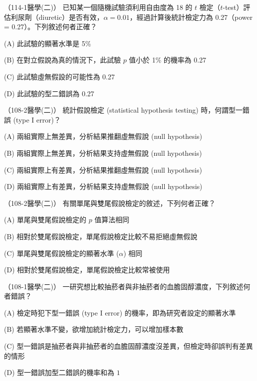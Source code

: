     \begin{docexam}{（114-1醫學(二)）}
        已知某一個隨機試驗須利用自由度為 18 的 $t$ 檢定（$t$-test）評估利尿劑（diuretic）是否有效，$\alpha = 0.01$，經過計算後統計檢定力為 0.27（power = 0.27）。下列敘述何者正確？

        (A) 此試驗的顯著水準是 5\%

        (B) 在對立假說為真的情況下，此試驗 $p$ 值小於 1\% 的機率為 0.27

        (C) 此試驗虛無假設的可能性為 0.27

        (D) 此試驗的型二錯誤為 0.27
    \end{docexam}

    \begin{docexam}{（108-2醫學(二)）}
        統計假說檢定 (statistical hypothesis testing) 時，何謂型一錯誤 (type I error)？

        (A) 兩組實際上無差異，分析結果推翻虛無假說 (null hypothesis)

        (B) 兩組實際上無差異，分析結果支持虛無假說 (null hypothesis)

        (C) 兩組實際上有差異，分析結果推翻虛無假說 (null hypothesis)

        (D) 兩組實際上有差異，分析結果支持虛無假說 (null hypothesis)
    \end{docexam}

    \begin{docexam}{（108-2醫學(二)）}
        有關單尾與雙尾假說檢定的敘述，下列何者正確？

        (A) 單尾與雙尾假說檢定的 $p$ 值算法相同

        (B) 相對於雙尾假說檢定，單尾假說檢定比較不易拒絕虛無假說

        (C) 單尾與雙尾假說檢定的顯著水準 ($\alpha$) 相同

        (D) 相對於雙尾假說檢定，單尾假說檢定比較常被使用
    \end{docexam}

    \begin{docexam}{（108-1醫學(二)）}
        一研究想比較抽菸者與非抽菸者的血膽固醇濃度，下列敘述何者錯誤？

        (A) 檢定時犯下型一錯誤 (type I error) 的機率，即為研究者設定的顯著水準

        (B) 若顯著水準不變，欲增加統計檢定力，可以增加樣本數

        (C) 型一錯誤是抽菸者與非抽菸者的血膽固醇濃度沒差異，但檢定時卻誤判有差異的情形

        (D) 型一錯誤加型二錯誤的機率和為 $1$
    \end{docexam}

